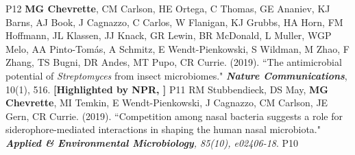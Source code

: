 \begin{cvpubs}
{    } %
    {P12} %
  \cvpub
    {\textbf{MG Chevrette}, CM Carlson, HE Ortega, C Thomas, GE Ananiev, KJ Barns, AJ Book, J Cagnazzo, C Carlos, W Flanigan, KJ Grubbs, HA Horn, FM Hoffmann, JL Klassen, JJ Knack, GR Lewin, BR McDonald, L Muller, WGP Melo, AA Pinto-Tom\'{a}s, A Schmitz, E Wendt-Pienkowski, S Wildman, M Zhao, F Zhang, TS Bugni, DR Andes, MT Pupo, CR Currie. (2019). ``The antimicrobial potential of \textit{Streptomyces} from insect microbiomes." \textit{\textbf{Nature Communications}}, 10(1), 516. \textbf{\textit{}}
    \linebreak \textbf{[Highlighted by NPR, \textit{}]}
    } %
    {P11} %
  \cvpub
    {RM Stubbendieck, DS May, \textbf{MG Chevrette}, MI Temkin, E Wendt-Pienkowski, J Cagnazzo, CM Carlson, JE Gern, CR Currie. (2019). ``Competition among nasal bacteria suggests a role for siderophore-mediated interactions in shaping the human nasal microbiota." \textit{\textbf{Applied \& Environmental Microbiology}, 85(10), e02406-18}. \textbf{\textit{}}
    } %
    {P10} %
\end{cvpubs}
